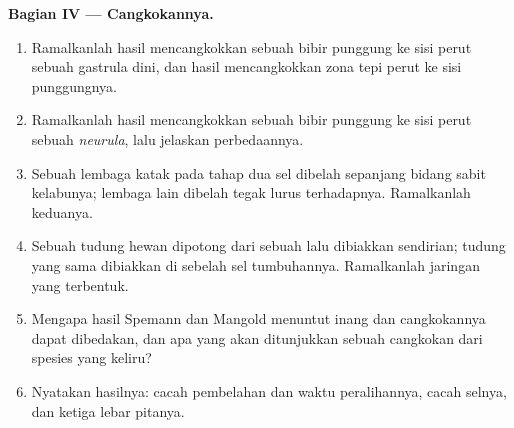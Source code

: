 \begin{problem}
\medskip
\noindent\textbf{Bagian IV --- Cangkokannya.}
\begin{enumerate}[resume]
  \item Ramalkanlah hasil mencangkokkan sebuah bibir punggung ke sisi
        perut sebuah gastrula dini, dan hasil mencangkokkan zona tepi
        perut ke sisi punggungnya.
  \item Ramalkanlah hasil mencangkokkan sebuah bibir punggung ke sisi
        perut sebuah \emph{neurula}, lalu jelaskan perbedaannya.
  \item Sebuah lembaga katak pada tahap dua sel dibelah sepanjang
        bidang sabit kelabunya; lembaga lain dibelah tegak lurus
        terhadapnya. Ramalkanlah keduanya.
  \item Sebuah tudung hewan dipotong dari sebuah  lalu dibiakkan
        sendirian; tudung yang sama dibiakkan di sebelah sel
        tumbuhannya. Ramalkanlah jaringan yang terbentuk.
  \item Mengapa hasil Spemann dan Mangold menuntut inang dan
        cangkokannya dapat dibedakan, dan apa yang akan ditunjukkan
        sebuah cangkokan dari spesies yang keliru?
  \item Nyatakan hasilnya: cacah pembelahan dan waktu peralihannya,
        cacah selnya, dan ketiga lebar pitanya.
\end{enumerate}
\end{problem}
